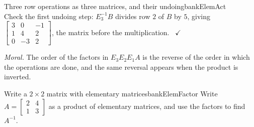 \documentclass[11pt]{article}
\begin{document}
\begin{exmp}{Three row operations as three matrices, and their undoing}{bankElemAct}
\[\]
Check the first undoing step: $E_3^{-1}B$ divides row $2$ of $B$ by $5$, giving $\begin{bmatrix}3&0&-1\\1&4&2\\0&-3&2\end{bmatrix}$, the matrix before the multiplication. \ $\checkmark$

\emph{Moral.} The order of the factors in $E_3E_2E_1A$ is the reverse of the order in which the operations are done, and the same reversal appears when the product is inverted.
\end{exmp}

\begin{exmp}{Write a $2\times2$ matrix with elementary matrices}{bankElemFactor}
Write $A=\begin{bmatrix}2&4\\1&3\end{bmatrix}$ as a product of elementary matrices, and use the factors to find $A^{-1}$.


\end{exmp}
\end{document}
